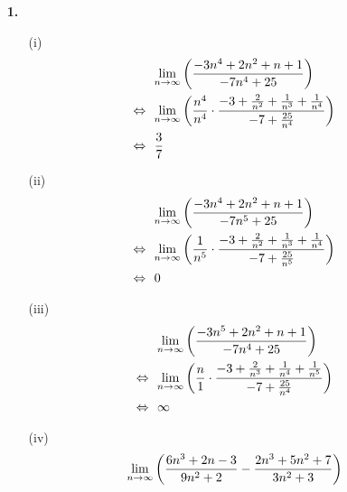 \documentclass [a4paper,12pt]{article}
\author{\authorinfotitle}
\title{\titleinfo}
\date{\today}
\begin{document}
\maketitle
    \begin{enumerate}
        \item[\textbf{1.}]
            \begin{enumerate}
                \item[(i)]
                    \begin{align}
                        &\underset{n \to \infty}{\lim}
                        \left( \frac{-3n^4+2n^2+n+1}{-7n^4+25} \right) \\
                        \Leftrightarrow \ \ &\underset{n \to \infty}{\lim}
                        \left( \frac{n^4}{n^4} \cdot \frac{-3+ \frac{2}{n^2} + \frac{1}{n^3} + \frac{1}{n^4}}{-7+ \frac{25}{n^4}} \right) \\
                        \Leftrightarrow \ \ &\frac{3}{7}
                    \end{align}
                \item[(ii)]
                    \begin{align}
                        &\limp
                        \left( \frac{-3n^4+2n^2+n+1}{-7n^5+25} \right) \\
                        \Leftrightarrow \  \ &\limp
                        \left( \frac{1}{n^5} \cdot \frac{-3+ \frac{2}{n^2} + \frac{1}{n^3} + \frac{1}{n^4}}{-7+ \frac{25}{n^5}} \right) \\
                        \Leftrightarrow \ \ &0 %
                    \end{align}
                \item[(iii)]
                    \begin{align}
                        &\underset{n \to \infty}{\lim}
                        \left( \frac{-3n^5+2n^2+n+1}{-7n^4+25} \right) \\
                        \Leftrightarrow \ \ & \underset{n \to \infty}{\lim}
                        \left( \frac{n}{1} \cdot \frac{-3+ \frac{2}{n^3} + \frac{1}{n^4} + \frac{1}{n^5}}{-7+ \frac{25}{n^4}} \right) \\
                        \Leftrightarrow \ \ &\infty
                    \end{align}
                \item[(iv)]
                    \begin{align}
                        &\limp
                        \left( \frac{6n^3+2n-3}{9n^2+2} - \frac{2n^3+5n^2+7}{3n^2+3} \right) \\

\end{align}
\end{enumerate}
\end{enumerate}
\end{document}
